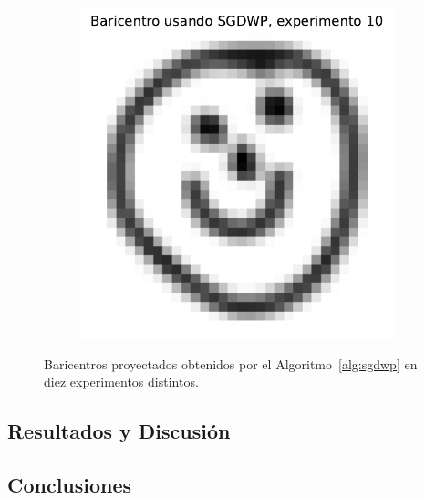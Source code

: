 \begin{figure}[H]
\begin{subfigure}[b]{0.17\textwidth}
        \label{fig:bar-SGDWP-exp-09}
    \end{subfigure}
    \hfill
    \begin{subfigure}[b]{0.17\textwidth}
        \centering
        \includegraphics[width=\textwidth]{img/sgdwp/bar-SGDWP-exp-10.pdf}
        \label{fig:bar-SGDWP-exp-10}
    \end{subfigure}
    \caption{Baricentros proyectados obtenidos por el Algoritmo~\ref{alg:sgdwp} en diez experimentos distintos.}
    \label{fig:bar-SGDWP-exp}
\end{figure}




\subsection{Resultados y Discusión}\label{ssec:sgdwp-resultados-discusion}  %



\subsection{Conclusiones}\label{ssec:sgdwp-conclusiones}  %

